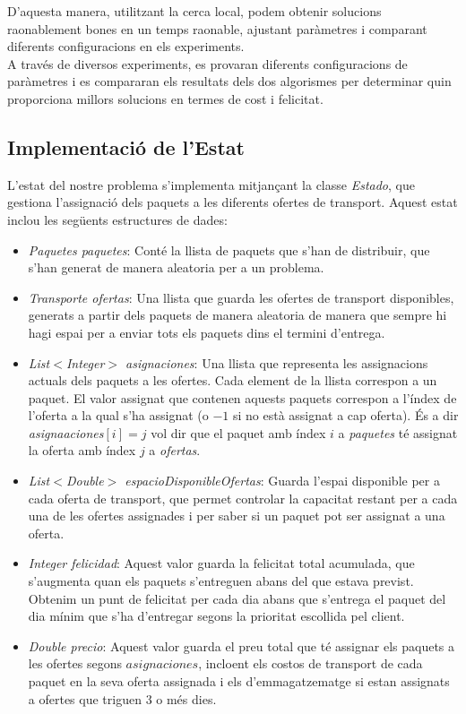 \documentclass[a4paper]{article}
\begin{document}
	D'aquesta manera, utilitzant la cerca local, podem obtenir solucions raonablement bones en un temps raonable, ajustant paràmetres i comparant diferents configuracions en els experiments. \\
	
	A través de diversos experiments, es provaran diferents configuracions de paràmetres i es compararan els resultats dels dos algorismes per determinar quin proporciona millors solucions en termes de cost i felicitat.
	
	\subsection{Implementació de l'Estat}
	
	L'estat del nostre problema s'implementa mitjançant la classe \emph{Estado}, que gestiona l'assignació dels paquets a les diferents ofertes de transport. Aquest estat inclou les següents estructures de dades:
	
	\begin{itemize}
		\item \emph{Paquetes paquetes}: Conté la llista de paquets que s'han de distribuir, que s'han generat de manera aleatoria per a un problema.
		\item \emph{Transporte ofertas}: Una llista que guarda les ofertes de transport disponibles, generats a partir dels paquets de manera aleatoria de manera que sempre hi hagi espai per a enviar tots els paquets dins el termini d'entrega.
		\item \emph{List$<$Integer$>$ asignaciones}: Una llista que representa les assignacions actuals dels paquets a les ofertes. Cada element de la llista correspon a un paquet. El valor assignat que contenen aquests paquets correspon a l'índex de l'oferta a la qual s'ha assignat (o $-1$ si no està assignat a cap oferta). És a dir \emph{asignaaciones$[i] = j$} vol dir que el paquet amb índex $i$ a \emph{paquetes} té assignat la oferta amb índex $j$ a \emph{ofertas}.
		\item \emph{List$<$Double$>$ espacioDisponibleOfertas}: Guarda l'espai disponible per a cada oferta de transport, que permet controlar la capacitat restant per a cada una de les ofertes assignades i per saber si un paquet pot ser assignat a una oferta.
		\item \emph{Integer felicidad}: Aquest valor guarda la felicitat total acumulada, que s'augmenta quan els paquets s'entreguen abans del que estava previst. Obtenim un punt de felicitat per cada dia abans que s'entrega el paquet del dia mínim que s'ha d'entregar segons la prioritat escollida pel client.
		\item \emph{Double precio}: Aquest valor guarda el preu total que té assignar els paquets a les ofertes segons $asignaciones$, incloent els costos de transport de cada paquet en la seva oferta assignada i els d'emmagatzematge si estan assignats a ofertes que triguen $3$ o més dies.
	\end{itemize}
		
\end{document}
